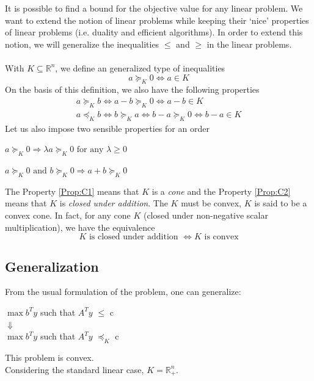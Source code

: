 It is possible to find a bound for the objective value for any linear problem. We want to extend the notion of linear problems while keeping their `nice' properties of linear problems (i.e. duality and efficient algorithms). In order to extend this notion, we will generalize the inequalities $\leq$ and $\geq$ in the linear problems. \\ \\
With $K \subseteq \mathbb{R}^n$, we define an generalized type of inequalities\[ a \succeq_K 0
 \Leftrightarrow a \in K \]
On the basis of this definition, we also have the following properties \begin{align*}
 a \succeq_K b \Leftrightarrow a-b \succeq_K 0
\Leftrightarrow a-b \in K \\ a \preceq_K b
\Leftrightarrow b \succeq_K a \Leftrightarrow b-a \succeq_K 0
\Leftrightarrow b-a \in K \end{align*}
Let us also impose two sensible properties for an order

\begin{property}
\label{Prop:C1}
$a \succeq_K 0 \Rightarrow \lambda a \succeq_K 0 \text{ for any } \lambda \ge 0$ 
\end{property}
\begin{property}
\label{Prop:C2}
$a \succeq_K 0 \text{ and } b \succeq_K 0 \Rightarrow a+b \succeq_K 0$
\end{property}
The Property \ref{Prop:C1} means that $K$ is a \emph{cone} and the Property \ref{Prop:C2} means that $K$ is \emph{closed under addition}.
The $K$ must be convex, $K$ is said to be a convex cone. In fact, for any cone $K$ (closed under non-negative scalar multiplication), we have the equivalence
\[ K \text{ is closed under addition } \Leftrightarrow K \text{ is convex} \]

\subsection{Generalization}
From the usual formulation of the problem, one can generalize: 
\begin{center}$\max b^Ty$ such that $A^Ty$ $\leqslant$ c \\
$\Downarrow$ \\
$\max b^Ty$ such that $A^Ty$ $\preceq_K$ c
\end{center}
This problem is convex.\\
Considering the standard linear case, $K = \mathbb{R}^n_+$.

